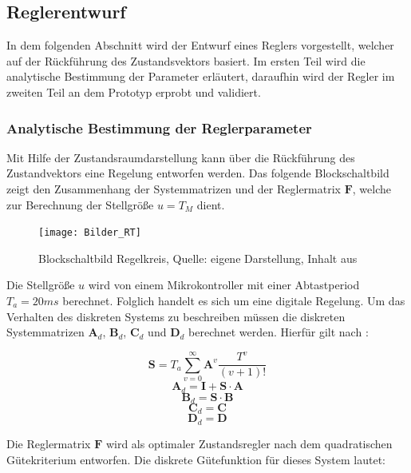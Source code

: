 \subsection{Reglerentwurf}
In dem folgenden Abschnitt wird der Entwurf eines Reglers vorgestellt, welcher auf der Rückführung des Zustandsvektors basiert. Im ersten Teil wird die analytische Bestimmung der Parameter erläutert, daraufhin wird der Regler im zweiten Teil an dem Prototyp erprobt und validiert.

\subsubsection{Analytische Bestimmung der Reglerparameter}
Mit Hilfe der Zustandsraumdarstellung kann über die Rückführung des Zustandvektors eine Regelung entworfen werden. Das folgende Blockschaltbild zeigt den Zusammenhang der Systemmatrizen und der Reglermatrix $\textbf{F}$, welche zur Berechnung der Stellgröße $u=T_M$ dient.

\begin{figure}[h]
\label{Regelkreis_pic}
\texttt{[image: Bilder\_RT]}
\caption{Blockschaltbild Regelkreis, Quelle: eigene Darstellung, Inhalt aus \cite{RT2}}
\end{figure}

Die Stellgröße $u$ wird von einem Mikrokontroller mit einer Abtastperiod $T_a = 20ms$ berechnet. Folglich handelt es sich um eine digitale Regelung. Um das Verhalten des diskreten Systems zu beschreiben müssen die diskreten Systemmatrizen $\textbf{A}_d$, $\textbf{B}_d$, $\textbf{C}_d$ und $\textbf{D}_d$ berechnet werden. Hierfür gilt nach \cite{RT2}:

\begin{equation}
\textbf{S} = T_a \sum_{v=0}^{\infty} \textbf{A}^v \frac{T^v}{(v+1)!}
\end{equation}
\begin{equation}
\textbf{A}_d = \textbf{I} + \textbf{S} \cdot \textbf{A}
\end{equation}
\begin{equation}
\textbf{B}_d = \textbf{S} \cdot \textbf{B}
\end{equation}
\begin{equation}
\textbf{C}_d = \textbf{C}
\end{equation}
\begin{equation}
\textbf{D}_d = \textbf{D}
\end{equation}

Die Reglermatrix $\textbf{F}$ wird als optimaler Zustandsregler nach dem quadratischen Gütekriterium entworfen. Die diskrete Gütefunktion für dieses System lautet:

